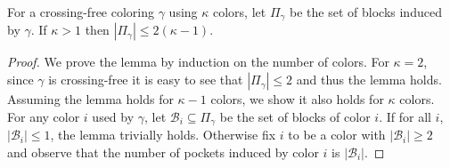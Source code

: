 \documentclass{llncs}
\begin{document}
\begin{lemma}
For a {crossing-free coloring $\gamma$ using $\kappa$ colors}, let  $\Pi_\gamma$ be the set of blocks induced by  $\gamma$. If $\kappa > 1$ then $|\Pi_\gamma| \leq 2 (\kappa - 1)$.
\label{indLem}
\end{lemma}
\begin{proof}

We prove the lemma by induction on the number  of colors. For $\kappa=2$, since $\gamma$ is crossing-free it is easy to see that $|\Pi_\gamma| \leq 2$ and thus the lemma holds.  Assuming the lemma holds for $\kappa - 1$ colors, we show it also holds for $\kappa$ colors.  {For any color $i$ used by $\gamma$, let $\mathcal{B}_i \subseteq \Pi_\gamma$ be the set of blocks of color $i$}.  If for all $i$, $|\mathcal{B}_i| \leq 1$, the lemma trivially holds.  Otherwise fix $i$ to be a color with $|\mathcal{B}_i| \geq 2$ and observe that the number of pockets induced by color $i$ is $|\mathcal{B}_i|$. 





\end{proof}
\end{document}

